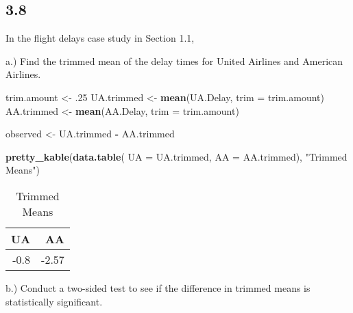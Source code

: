 \documentclass[
  12pt,
]{report}
\newenvironment{Shaded}{\begin{snugshade}}{\end{snugshade}}
\newcommand{\DataTypeTok}[1]{\textcolor[rgb]{0.13,0.29,0.53}{#1}}
\newcommand{\FloatTok}[1]{\textcolor[rgb]{0.00,0.00,0.81}{#1}}
\newcommand{\KeywordTok}[1]{\textcolor[rgb]{0.13,0.29,0.53}{\textbf{#1}}}
\newcommand{\NormalTok}[1]{#1}
\newcommand{\OperatorTok}[1]{\textcolor[rgb]{0.81,0.36,0.00}{\textbf{#1}}}
\newcommand{\StringTok}[1]{\textcolor[rgb]{0.31,0.60,0.02}{#1}}
\begin{document}
\newpage

\hypertarget{section-7}{%
\subsection{3.8}\label{section-7}}

In the flight delays case study in Section 1.1,

a.) Find the trimmed mean of the delay times for United Airlines and
American Airlines.

\begin{Shaded}
\begin{Highlighting}[]
\NormalTok{trim.amount <-}\StringTok{ }\FloatTok{.25}
\NormalTok{UA.trimmed <-}\StringTok{ }\KeywordTok{mean}\NormalTok{(UA.Delay, }\DataTypeTok{trim =}\NormalTok{ trim.amount)}
\NormalTok{AA.trimmed <-}\StringTok{ }\KeywordTok{mean}\NormalTok{(AA.Delay, }\DataTypeTok{trim =}\NormalTok{ trim.amount)}

\NormalTok{observed <-}\StringTok{ }\NormalTok{UA.trimmed }\OperatorTok{-}\StringTok{ }\NormalTok{AA.trimmed}

\KeywordTok{pretty_kable}\NormalTok{(}\KeywordTok{data.table}\NormalTok{( }\DataTypeTok{UA =}\NormalTok{ UA.trimmed, }\DataTypeTok{AA =}\NormalTok{ AA.trimmed), }\StringTok{"Trimmed Means"}\NormalTok{)}
\end{Highlighting}
\end{Shaded}

\begin{table}[!h]

\caption{\label{tab:unnamed-chunk-12}Trimmed Means}
\centering
\begin{tabular}[t]{r|r}
\hline
UA & AA\\
\hline
-0.8 & -2.57\\
\hline
\end{tabular}
\end{table}

b.) Conduct a two-sided test to see if the difference in trimmed means
is statistically significant.
\end{document}
